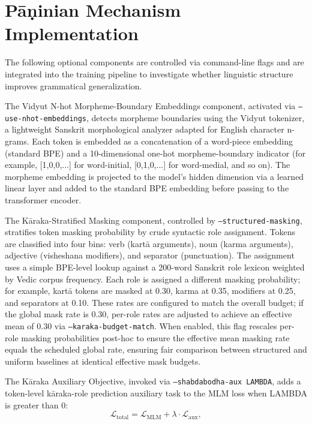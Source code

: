 \section{Pāṇinian Mechanism Implementation}

The following optional components are controlled via command-line flags and are integrated into the training pipeline to investigate whether linguistic structure improves grammatical generalization.

The Vidyut N-hot Morpheme-Boundary Embeddings component, activated via \texttt{--use-nhot-embeddings}, detects morpheme boundaries using the Vidyut tokenizer, a lightweight Sanskrit morphological analyzer adapted for English character n-grams. Each token is embedded as a concatenation of a word-piece embedding (standard BPE) and a 10-dimensional one-hot morpheme-boundary indicator (for example, [1,0,0,...] for word-initial, [0,1,0,...] for word-medial, and so on). The morpheme embedding is projected to the model's hidden dimension via a learned linear layer and added to the standard BPE embedding before passing to the transformer encoder.

The Kāraka-Stratified Masking component, controlled by \texttt{--structured-masking}, stratifies token masking probability by crude syntactic role assignment. Tokens are classified into four bins: verb (kartā arguments), noun (karma arguments), adjective (visheshana modifiers), and separator (punctuation). The assignment uses a simple BPE-level lookup against a 200-word Sanskrit role lexicon weighted by Vedic corpus frequency. Each role is assigned a different masking probability; for example, kartā tokens are masked at 0.30, karma at 0.35, modifiers at 0.25, and separators at 0.10. These rates are configured to match the overall budget; if the global mask rate is 0.30, per-role rates are adjusted to achieve an effective mean of 0.30 via \texttt{--karaka-budget-match}. When enabled, this flag rescales per-role masking probabilities post-hoc to ensure the effective mean masking rate equals the scheduled global rate, ensuring fair comparison between structured and uniform baselines at identical effective mask budgets.

The Kāraka Auxiliary Objective, invoked via \texttt{--shabdabodha-aux LAMBDA}, adds a token-level kāraka-role prediction auxiliary task to the MLM loss when LAMBDA is greater than 0:
%
\begin{equation}
\mathcal{L}_{\text{total}} = \mathcal{L}_{\text{MLM}} + \lambda \cdot \mathcal{L}_{\text{aux}},
\end{equation}

